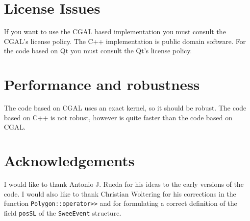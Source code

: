 \documentclass[a4paper]{article}
\begin{document}
%
%

\section{License Issues}

If you want to use the CGAL based implementation you must consult the CGAL's license policy. The C++ implementation is public domain software. For
the code based on Qt you must consult the Qt's license policy.

%
%

\section{Performance and robustness}

The code based on CGAL uses an exact kernel, so it should be robust. The code based on C++ is not robust, however is quite faster than the
code based on CGAL.


\section{Acknowledgements}

I would like to thank Antonio J. Rueda for his ideas to the early versions of the code. I would also like to thank Christian Woltering for his corrections in the function \lstinline+Polygon::operator>>+ and for formulating a correct
definition of the field \lstinline+posSL+ of the \lstinline+SweeEvent+ structure.
\end{document}

